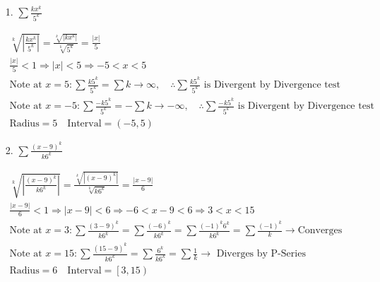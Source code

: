     \begin{itemize}
        \item [1.] $\sum\frac{kx^{k}}{5^{k}}$
        \\
        \begin{mdframed}
            \begin{equation*}
                \begin{gathered}
                    \sqrt[k]{\left|\frac{kx^{k}}{5^{k}}\right|} =
                \frac{\sqrt[k]{|kx^{k}|}}{\sqrt[k]{5^{k}}} =
                \frac{|x|}{5}                                                   \\
                \frac{|x|}{5} < 1 \Rightarrow |x| < 5 \Rightarrow -5 < x < 5    \\
                \text{Note at } x = 5: \sum\frac{k5^{k}}{5^{k}} = \sum k \rightarrow \infty, \quad
                \therefore \sum\frac{k5^{k}}{5^{k}} \text{ is Divergent by Divergence test}        
                \\
                \text{Note at } x = -5: \sum\frac{-k5^{k}}{5^{k}} = -\sum k \rightarrow -\infty, \quad
                \therefore \sum\frac{-k5^{k}}{5^{k}} \text{ is Divergent by Divergence test}        
                \\
                \text{Radius} = 5 \quad \text{Interval} = \left(-5,5\right)
                \end{gathered}
            \end{equation*}
        \end{mdframed}

        \item [2.] $\sum\frac{(x-9)^{k}}{k6^{k}}$
        \\
        \begin{mdframed}
            \begin{equation*}
                \begin{gathered}
                    \sqrt[k]{\left|\frac{(x-9)^{k}}{k6^{k}}\right|} =
                    \frac{\sqrt[k]{|(x-9)^{k}|}}{\sqrt[k]{k6^{k}}} =
                    \frac{|x-9|}{6}                                         \\
                    \frac{|x-9|}{6} < 1 \Rightarrow |x-9| < 6 \Rightarrow 
                    -6 < x-9 < 6 \Rightarrow 3 < x < 15                     \\
                    \text{Note at } x=3: \sum\frac{(3-9)^{k}}{k6^{k}} =
                    \sum\frac{(-6)^{k}}{k6^{k}} = 
                    \sum\frac{(-1)^{k}6^{k}}{k6^{k}} =
                    \sum\frac{(-1)^{k}}{k} \rightarrow 
                    \text{Converges}                                        \\
                    \text{Note at } x=15: \sum\frac{(15-9)^{k}}{k6^{k}} =
                    \sum\frac{6^{k}}{k6^{k}} = 
                    \sum\frac{1}{k} \rightarrow \text{ Diverges by P-Series}\\
                    \text{Radius} = 6 \quad \text{Interval} = \left[3,15\right)
                \end{gathered}
            \end{equation*}
        \end{mdframed}


\end{itemize}
